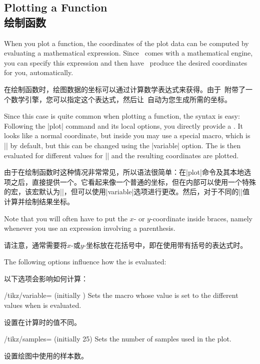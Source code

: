 \subsection{Plotting a Function\\绘制函数}
\label{section-tikz-plot}

When you plot a function, the coordinates of the plot data can be computed by
evaluating a mathematical expression. Since \pgfname\ comes with a mathematical
engine, you can specify this expression and then have \tikzname\ produce the
desired coordinates for you, automatically.

在绘制函数时，绘图数据的坐标可以通过计算数学表达式来获得。由于\pgfname\ 附带了一个数学引擎，您可以指定这个表达式，然后让\tikzname\ 自动为您生成所需的坐标。

Since this case is quite common when plotting a function, the syntax is easy:
Following the |plot| command and its local options, you directly provide a
. It looks like a normal coordinate, but inside you
may use a special macro, which is |\x| by default, but this can be changed
using the |variable| option. The  is then evaluated
for different values for |\x| and the resulting coordinates are plotted.

由于在绘制函数时这种情况非常常见，所以语法很简单：在|plot|命令及其本地选项之后，直接提供一个。它看起来像一个普通的坐标，但在内部可以使用一个特殊的宏，该宏默认为|\x|，但可以使用|variable|选项进行更改。然后，对于不同的|\x|值计算并绘制结果坐标。

Note that you will often have to put the $x$- or $y$-coordinate inside braces,
namely whenever you use an expression involving a parenthesis.

请注意，通常需要将$x$-或$y$-坐标放在花括号中，即在使用带有括号的表达式时。

The following options influence how the  is
evaluated:

以下选项会影响如何计算：


\begin{key}{/tikz/variable= (initially \string\x)}
    Sets the macro whose value is set to the different values when
     is evaluated.

    设置在计算时的值不同。

\end{key}

\begin{key}{/tikz/samples= (initially 25)}
    Sets the number of samples used in the plot.

    设置绘图中使用的样本数。

\end{key}

